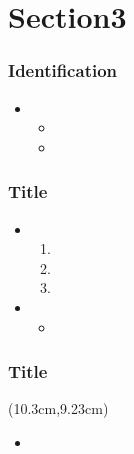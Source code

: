 \documentclass[13pt]{beamer}
\begin{document}
\section{Section3}
\setcounter{subsection}{1} %

\begin{frame}[label=identification]\frametitle{Identification}
\begin{itemize}		
	\item 
	\begin{itemize}
		\item		
		\item 
	\end{itemize}
\end{itemize}
\end{frame}


\begin{frame}[label=title3]\frametitle{Title}
\begin{itemize}
\item 
\begin{enumerate}		
	\item 	\pause\item 
	\pause\item \end{enumerate}
\pause\item 
	\begin{itemize}
	\item 
	\end{itemize}
\end{itemize}
\end{frame}


\appendix 

{ %
\frame[plain]{}
} 
\addtocounter{framenumber}{-1}



\begin{frame}[plain, label=appendix1]\frametitle{Title}
    \begin{textblock*}{3cm}(10.3cm,9.23cm)
		\hyperlink{title1}{}
	\end{textblock*}
\begin{itemize}
	\item 
\end{itemize}
\end{frame}
\end{document}
